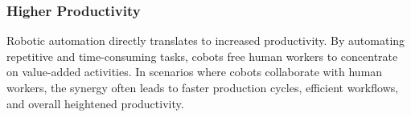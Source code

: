 \subsubsection{Higher Productivity}

Robotic automation directly translates to increased productivity. By automating repetitive and time-consuming tasks, cobots free human workers to concentrate on value-added activities. 
In scenarios where cobots collaborate with human workers, the synergy often leads to faster production cycles, efficient workflows, and overall heightened productivity.

